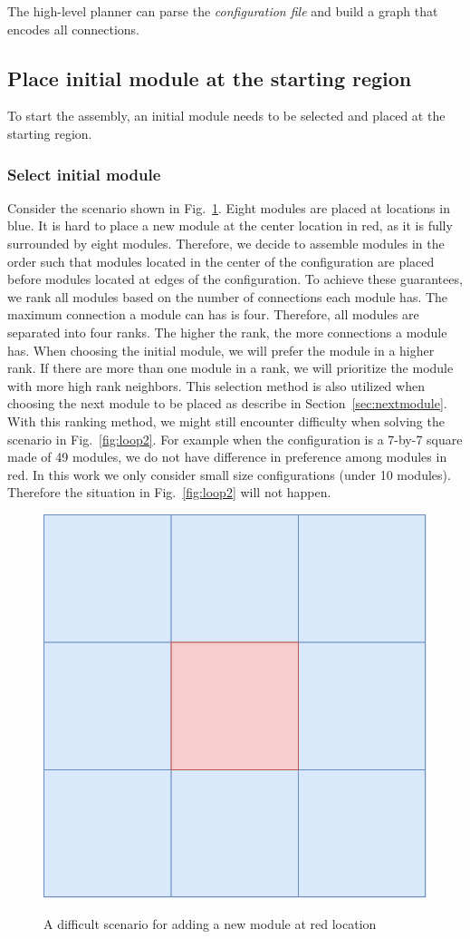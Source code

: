 The high-level planner can parse the {\it configuration file} and build a graph that encodes all connections.

\subsection{Place initial module at the starting region}
To start the assembly, an initial module needs to be selected and placed at the starting region.
\subsubsection{Select initial module}
Consider the scenario shown in Fig.~\ref{fig:loop}. Eight modules are placed at locations in blue.
It is hard to place a new module at the center location in red, as it is  fully surrounded by eight modules. Therefore, we decide to assemble modules in the order such that modules located in the center of the configuration are placed before modules located at edges of the configuration.
To achieve these guarantees, we rank all modules based on the number of connections each module has. The maximum connection a module can has is four.
Therefore, all modules are separated into four ranks. The higher the rank, the more connections a module has. 
When choosing the initial module, we will prefer the module in a higher rank. 
If there are more than one module in a rank, we will prioritize the module with more high rank neighbors.
This selection method is also utilized when choosing the next module to be placed as describe in Section~\ref{sec:nextmodule}.
With this ranking method, we might still encounter difficulty when solving the scenario in Fig.~\ref{fig:loop2}.
For example when the configuration is a 7-by-7 square made of 49 modules, we do not have difference in preference among modules in red.
In this work we only consider small size configurations (under 10 modules). Therefore the situation in Fig.~\ref{fig:loop2} will not happen.

\begin{figure}[ht!]%
\centering
{\includegraphics[width=0.3\columnwidth]{pics/moduleloop.pdf}}
\caption{A difficult scenario for adding a new module at red location}
\label{fig:loop}
\end{figure}

